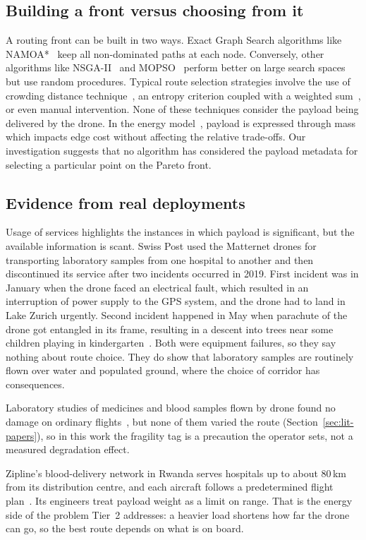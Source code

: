 \subsection{Building a front versus choosing from it}

A routing front can be built in two ways. Exact Graph Search algorithms like
NAMOA*~\cite{r17} keep all non-dominated paths at each node. Conversely, other
algorithms like NSGA-II~\cite{r8} and MOPSO~\cite{r6} perform better on large search
spaces but use random procedures. Typical route selection strategies involve the use of crowding distance
technique~\cite{r8,r3}, an entropy criterion coupled with a weighted sum~\cite{r1}, or
even manual intervention. None of these techniques consider the payload being
delivered by the drone. In the energy model~\cite{r10}, payload is expressed through
mass which impacts edge cost without affecting the relative trade-offs. Our
investigation suggests that no algorithm has considered the payload metadata for
selecting a particular point on the Pareto front.

\subsection{Evidence from real deployments}

Usage of services highlights the instances in which payload is significant, but the
available information is scant. Swiss Post used the Matternet drones for transporting
laboratory samples from one hospital to another and then discontinued its service after
two incidents occurred in 2019. First incident was in January when the drone faced an
electrical fault, which resulted in an interruption of power supply to the GPS system,
and the drone had to land in Lake Zurich urgently. Second incident happened in May when
parachute of the drone got entangled in its frame, resulting in a descent into trees
near some children playing in kindergarten~\cite{r12}. Both were equipment failures, so they say
nothing about route choice. They do show that laboratory samples are routinely flown
over water and populated ground, where the choice of corridor has consequences.

Laboratory studies of medicines and blood samples flown by drone found no damage on
ordinary flights~\cite{r13,r14,r15}, but none of them varied the route
(Section~\ref{sec:lit-papers}), so in this work the fragility tag is a precaution the
operator sets, not a measured degradation effect.

Zipline's blood-delivery network in Rwanda serves hospitals up to about 80\,km from its
distribution centre, and each aircraft follows a predetermined flight plan~\cite{r16}.
Its engineers treat payload weight as a limit on range. That is the energy side of the
problem Tier~2 addresses: a heavier load shortens how far the drone can go, so the best
route depends on what is on board.

